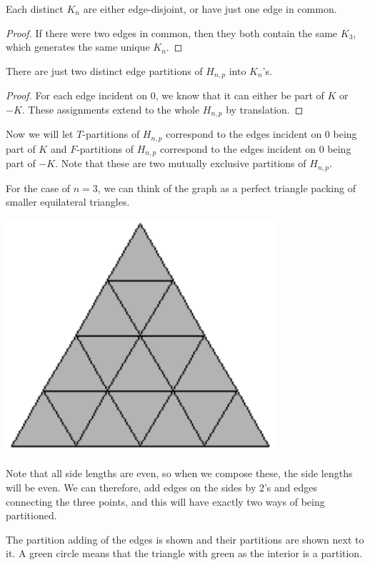 \documentclass[runningheads,a4paper]{llncs}
\begin{document}
\begin{lemma}
Each distinct $K_n$ are either edge-disjoint, or have just one edge in common.
\end{lemma}

\begin{proof}
If there were two edges in common, then they both contain the same $K_3$, which generates the same unique $K_n$. 
\end{proof}

\begin{lemma}
There are just two distinct edge partitions of $H_{n,p}$ into $K_n$'s.
\end{lemma}

\begin{proof}
For each edge incident on 0, we know that it can either be part of $K$ or $-K$. These assignments extend to the whole $H_{n,p}$ by translation.
\end{proof}

Now we will let $T$-partitions of $H_{n,p}$ correspond to the edges incident on $0$ being part of $K$ and $F$-partitions of $H_{n,p}$ correspond to the edges incident on $0$ being part of $-K$. Note that these are two mutually exclusive partitions of $H_{n,p}$.

For the case of $n=3$, we can think of the graph as a perfect triangle packing of smaller equilateral triangles. 

\includegraphics[width=0.2\linewidth]{EdgePartitionPic1.pdf}

Note that all side lengths are even, so when we compose these, the side lengths will be even. We can therefore, add edges on the sides by 2's and edges connecting the three points, and this will have exactly two ways of being partitioned. 

The partition adding of the edges is shown and their partitions are shown next to it. A green circle means that the triangle with green as the interior is a partition.
\end{document}
